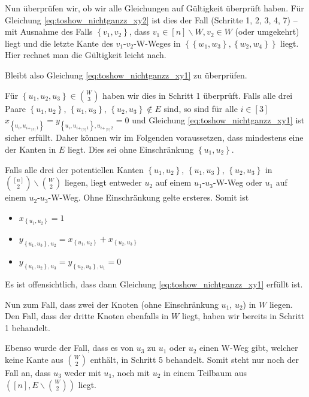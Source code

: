 \documentclass[10p,a4paper,BCOR = 12mm, DIV=15]{scrbook}
\begin{document}
\begin{bew}
Nun überprüfen wir, ob wir alle Gleichungen auf Gültigkeit überprüft haben. Für Gleichung \eqref{eq:toshow_nichtganzz_xy2} ist dies der Fall (Schritte 1, 2, 3, 4, 7) -- mit Ausnahme des Falls $\left\{v_1, v_2\right\}$, dass $v_1 \in  \left[n\right] \backslash W, v_2 \in W$ (oder umgekehrt) liegt und die letzte Kante des $v_1$-$v_2$-W-Weges in $\left\{\left\{w_1, w_3\right\}, \left\{w_2, w_4\right\}\right\}$ liegt. Hier rechnet man die Gültigkeit leicht nach.

Bleibt also Gleichung \eqref{eq:toshow_nichtganzz_xy1} zu überprüfen.

Für $\left\{u_1, u_2, u_3\right\} \in {W \choose 3}$ haben wir dies in Schritt 1 überprüft. Falls alle drei Paare $\left\{u_1, u_2\right\}$, $\left\{u_1, u_3\right\}$, $\left\{u_2, u_3\right\} \notin E$ sind, so sind für alle $i \in \left[3\right]$ $x_{\left\{u_i, u_{i +_{[3]} 1}\right\}} = y_{\left\{u_i, u_{i +_{[3]} 1}\right\}, u_{i +_{[3]} 2}} = 0$ und Gleichung \eqref{eq:toshow_nichtganzz_xy1} ist sicher erfüllt. Daher können wir im Folgenden voraussetzen, dass mindestens eine der Kanten in $E$ liegt. Dies sei ohne Einschränkung $\left\{u_1, u_2\right\}$.

Falls alle drei der potentiellen Kanten $\left\{u_1, u_2\right\}$, $\left\{u_1, u_3\right\}$, $\left\{u_2, u_3\right\}$ in ${\left[n\right] \choose 2} \backslash {W \choose 2}$ liegen, liegt entweder $u_2$ auf einem $u_1$-$u_3$-W-Weg oder $u_1$ auf einem $u_2$-$u_3$-W-Weg. Ohne Einschränkung gelte ersteres. Somit ist
\begin{itemize}
\item $x_{\left\{u_1, u_2\right\}} = 1$
\item $y_{\left\{u_1, u_3\right\}, u_2} = x_{\left\{u_1, u_2\right\}} + x_{\left\{u_2, u_3\right\}}$
\item $y_{\left\{u_1, u_2\right\}, u_3} = y_{\left\{u_2, u_3\right\}, u_1} = 0$
\end{itemize}
Es ist offensichtlich, dass dann Gleichung \eqref{eq:toshow_nichtganzz_xy1} erfüllt ist.

Nun zum Fall, dass zwei der Knoten (ohne Einschränkung $u_1$, $u_2$) in $W$ liegen. Den Fall, dass der dritte Knoten ebenfalls in $W$ liegt, haben wir bereits in Schritt 1 behandelt.

Ebenso wurde der Fall, dass es von $u_3$ zu $u_1$ oder $u_2$ einen W-Weg gibt, welcher keine Kante aus $W \choose 2$ enthält, in Schritt 5 behandelt. Somit steht nur noch der Fall an, dass $u_3$ weder mit $u_1$, noch mit $u_2$ in einem Teilbaum aus $\left(\left[n\right], E \backslash {W \choose 2}\right)$ liegt.


\end{bew}
\end{document}
